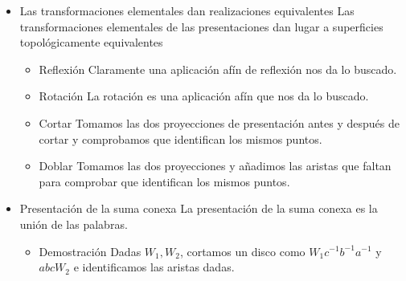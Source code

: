 \documentclass[11pt]{article}
\begin{document}
\begin{itemize}
\item Las transformaciones elementales dan realizaciones equivalentes
\label{sec-1-4-7-7}
Las transformaciones elementales de las presentaciones dan lugar a
superficies topológicamente equivalentes

\begin{itemize}
\item Reflexión
\label{sec-1-4-7-7-1}
Claramente una aplicación afín de reflexión nos da lo buscado.

\item Rotación
\label{sec-1-4-7-7-2}
La rotación es una aplicación afín que nos da lo buscado.

\item Cortar
\label{sec-1-4-7-7-3}
Tomamos las dos proyecciones de presentación antes y después de
cortar y comprobamos que identifican los mismos puntos.

\item Doblar
\label{sec-1-4-7-7-4}
Tomamos las dos proyecciones y añadimos las aristas que faltan para
comprobar que identifican los mismos puntos.
\end{itemize}

\item Presentación de la suma conexa
\label{sec-1-4-7-8}
La presentación de la suma conexa es la unión de las palabras.

\begin{itemize}
\item Demostración
\label{sec-1-4-7-8-1}
Dadas $W_1,W_2$, cortamos un disco como $W_1c^{-1}b^{-1}a^{-1}$ y $abcW_2$ e 
identificamos las aristas dadas.
\end{itemize}
\end{itemize}
\end{document}
